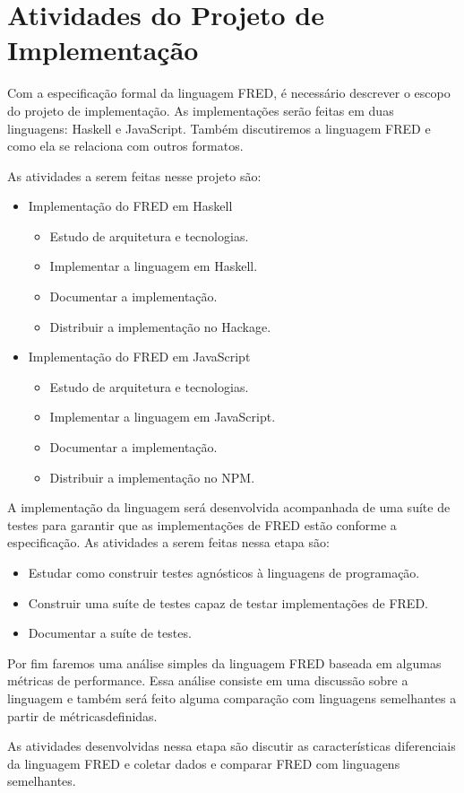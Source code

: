 \section{Atividades do Projeto de Implementação}

Com a especificação formal da linguagem FRED, é necessário 
descrever o escopo do projeto de implementação. As implementações serão feitas 
em duas linguagens: Haskell e JavaScript. Também discutiremos
a linguagem FRED e como ela se relaciona com outros formatos.

As atividades a serem feitas nesse projeto são:

\begin{itemize}
    \item Implementação do FRED em Haskell
    \begin{itemize}
        \item Estudo de arquitetura e tecnologias.
        \item Implementar a linguagem em Haskell.
        \item Documentar a implementação.
        \item Distribuir a implementação no Hackage.
    \end{itemize}
    \item Implementação do FRED em JavaScript
    \begin{itemize}
        \item Estudo de arquitetura e tecnologias.
        \item Implementar a linguagem em JavaScript.
        \item Documentar a implementação.
        \item Distribuir a implementação no NPM.
    \end{itemize}
\end{itemize}

A implementação da linguagem será desenvolvida acompanhada de uma suíte de testes 
para garantir que as implementações de FRED estão conforme a especificação.
As atividades a serem feitas nessa etapa são:

\begin{itemize}
    \item Estudar como construir testes agnósticos à linguagens de programação.
    \item Construir uma suíte de testes capaz de testar implementações de FRED.
    \item Documentar a suíte de testes.
\end{itemize}

Por fim faremos uma análise simples da linguagem FRED baseada em algumas métricas
de performance. Essa análise consiste 
em uma discussão sobre a linguagem e também será feito alguma comparação
com linguagens semelhantes a partir de métricasdefinidas.

As  atividades desenvolvidas nessa etapa são discutir as
características diferenciais da linguagem FRED e coletar dados e 
comparar FRED com linguagens semelhantes.